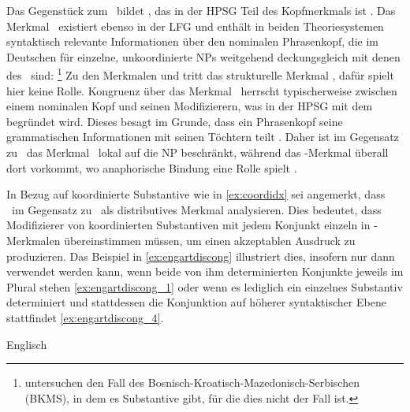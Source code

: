 \begin{exe}
\ex\label{ex:coordidx}
\begin{xlist}
\end{xlist}
\end{exe}

\label{phsec:concord}
Das Gegenstück zum \Index\ bildet \Concord, das in der HPSG Teil des
Kopfmerkmals ist \citep[17]{wechslerzlatic2003}. Das Merkmal \Concord\
existiert ebenso in der LFG \citep[189--192]{bresnanetal2016} und enthält in
beiden Theoriesystemen syntaktisch relevante Informationen über den nominalen
Phrasenkopf, die im Deutschen für einzelne, unkoordinierte NPs weitgehend
deckungsgleich mit denen des \Index\ sind:%
%
	\footnote{\citet{wechslerzlatic2003} untersuchen den Fall des
	Bosnisch-Kroatisch-Mazedonisch-Serbischen (BKMS), in dem es Substantive gibt,
	für die dies nicht der Fall ist.}
%
Zu den Merkmalen  und  tritt das
strukturelle Merkmal \leipzigfont{kasus}, dafür spielt 
hier keine Rolle. Kongruenz über das Merkmal \Concord\ herrscht typischerweise
zwischen einem nominalen Kopf und seinen Modifizierern, was in der HPSG mit dem
\fw{Head Feature Principle} begründet wird. Dieses besagt im Grunde, dass ein
Phrasenkopf seine grammatischen Informationen mit seinen Töchtern teilt
\autocite[vgl.][22]{wechslerzlatic2003}. Daher ist im Gegensatz zu
\Index\ das Merkmal \Concord\ lokal auf die NP beschränkt, während das
\Index-Merkmal überall dort vorkommt, wo anaphorische Bindung eine Rolle spielt
\parencites[14--16, 22]{wechslerzlatic2003}[189]{bresnanetal2016}.

In Bezug auf koordinierte Substantive wie in \cref{ex:coordidx} sei angemerkt,
dass \citet[76--78]{kingdalrymple2004} \Concord\ im Gegensatz zu \Index\ als
distributives Merkmal analysieren. Dies
bedeutet, dass Modifizierer von koordinierten Substantiven mit jedem Konjunkt
einzeln in \Concord-Merkmalen übereinstimmen müssen, um einen akzeptablen
Ausdruck zu produzieren. Das Beispiel in \cref{ex:engartdiscong} illustriert
dies, insofern \fw{these} \wdef{diese} nur dann verwendet werden kann, wenn
beide von ihm determinierten Konjunkte jeweils im Plural stehen
\cref{ex:engartdiscong_1} oder wenn es lediglich ein einzelnes Substantiv
determiniert und stattdessen die Konjunktion auf höherer syntaktischer Ebene
stattfindet \cref{ex:engartdiscong_4}.

\begin{exe}
\ex\label{ex:engartdiscong}
	Englisch \parencite[nach][70]{kingdalrymple2004}
	\begin{xlist}
		\label{ex:engartdiscong_1}
		\label{ex:engartdiscong_2}
		\label{ex:engartdiscong_3}
		\label{ex:engartdiscong_4}
	\end{xlist}
\end{exe}

